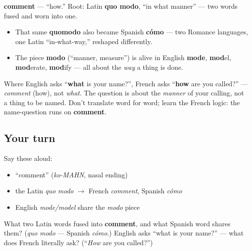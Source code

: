 \begin{cousinweb}
\textbf{comment} — \textquotedblleft{}how.\textquotedblright{} Root: Latin \textbf{quo modo}, \textquotedblleft{}in what manner\textquotedblright{} — two words fused and worn into one.

\begin{itemize}
\raggedright
  \item That same \textbf{quomodo} also became Spanish \textbf{cómo} — two Romance languages, one Latin \textquotedblleft{}in-what-way,\textquotedblright{} reshaped differently.
  \item The piece \textbf{modo} (\textquotedblleft{}manner, measure\textquotedblright{}) is alive in English \textbf{mode}, \textbf{mod}el, \textbf{mod}erate, \textbf{mod}ify — all about the \emph{way} a thing is done.
\end{itemize}
\end{cousinweb}

\begin{grammarlens}[title={Grammar Lens: French counts names as a matter of \textquotedblleft{}how\textquotedblright{}}]
Where English asks \textquotedblleft{}\textbf{what} is your name?\textquotedblright{}, French asks \textquotedblleft{}\textbf{how} are you called?\textquotedblright{} — \emph{comment} (how), not \emph{what}. The question is about the \emph{manner} of your calling, not a thing to be named. Don't translate word for word; learn the French logic: the name-question runs on \textbf{comment}.
\end{grammarlens}

\subsection*{Your turn}
Say these aloud:

\begin{itemize}
\raggedright
  \item \textquotedblleft{}comment\textquotedblright{} (\emph{ko-MAHN}, nasal ending)
  \item the Latin \emph{quo modo} $\to$ French \emph{comment}, Spanish \emph{cómo}
  \item English \emph{mode/model} share the \emph{modo} piece
\end{itemize}

\begin{tcolorbox}[breakable,colback=teal!4,colframe=teal!35!black,title={Before you move on}]
What two Latin words fused into \textbf{comment}, and what Spanish word shares them? (\emph{quo modo} — Spanish \emph{cómo}.) English asks \textquotedblleft{}what is your name?\textquotedblright{} — what does French literally ask? (\textquotedblleft{}\emph{How} are you called?\textquotedblright{})
\end{tcolorbox}
